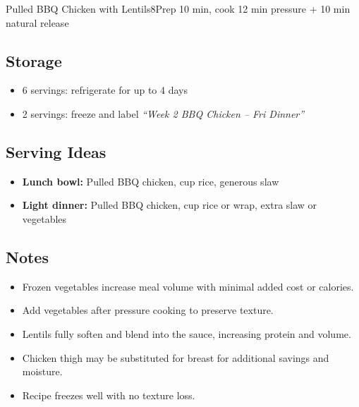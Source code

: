\begin{recipebox}{Pulled BBQ Chicken with Lentils}{8}{Prep 10 min, cook 12 min pressure + 10 min natural release}
\subsection*{Storage}
\begin{itemize}
    \item 6 servings: refrigerate for up to 4 days
    \item 2 servings: freeze and label \emph{``Week 2 BBQ Chicken -- Fri Dinner''}
\end{itemize}

\subsection*{Serving Ideas}
\begin{itemize}
    \item \textbf{Lunch bowl:} Pulled BBQ chicken,  cup rice, generous slaw
    \item \textbf{Light dinner:} Pulled BBQ chicken,  cup rice or wrap, extra slaw or vegetables
\end{itemize}

\subsection*{Notes}
\begin{itemize}
    \item Frozen vegetables increase meal volume with minimal added cost or calories.
    \item Add vegetables after pressure cooking to preserve texture.
    \item Lentils fully soften and blend into the sauce, increasing protein and volume.
    \item Chicken thigh may be substituted for breast for additional savings and moisture.
    \item Recipe freezes well with no texture loss.
\end{itemize}
\end{recipebox}
